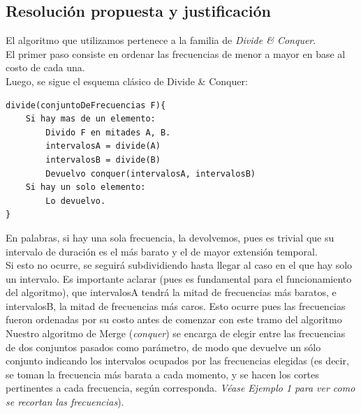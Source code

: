 \newpage

\subsection{Resoluci\'on propuesta y justificaci\'on}

El algoritmo que utilizamos pertenece a la familia de \emph{Divide \& Conquer}.\\


El primer paso consiste en ordenar las frecuencias de menor a mayor en base al costo de cada una.\\

Luego, se sigue el esquema cl\'asico de Divide \& Conquer:\\

	\begin{codesnippet}
	\begin{verbatim}
divide(conjuntoDeFrecuencias F){
    Si hay mas de un elemento:
        Divido F en mitades A, B.
        intervalosA = divide(A)
        intervalosB = divide(B)
        Devuelvo conquer(intervalosA, intervalosB)
    Si hay un solo elemento:
        Lo devuelvo.	
}
	\end{verbatim}
	\end{codesnippet}

En palabras, si hay una sola frecuencia, la devolvemos, pues es trivial que su intervalo de duraci\'on es el m\'as barato y el de mayor extensi\'on temporal.\\

Si esto no ocurre, se seguirá subdividiendo hasta llegar al caso en el que hay solo un intervalo.
Es importante aclarar (pues es fundamental para el funcionamiento del algoritmo), que intervalosA tendrá la mitad de frecuencias más baratos, e intervalosB, la mitad de frecuencias más caros. Esto ocurre pues las frecuencias fueron ordenadas por su costo antes de comenzar con este tramo del algoritmo\\

Nuestro algoritmo de Merge (\emph{conquer}) se encarga de elegir entre las frecuencias de dos conjuntos pasados como parámetro, de modo que devuelve un sólo conjunto indicando los intervalos ocupados por las frecuencias elegidas (es decir, se toman la frecuencia más barata a cada momento, y se hacen los cortes pertinentes a cada frecuencia, según corresponda. \emph{Véase Ejemplo 1 para ver como se recortan las frecuencias}).\\

